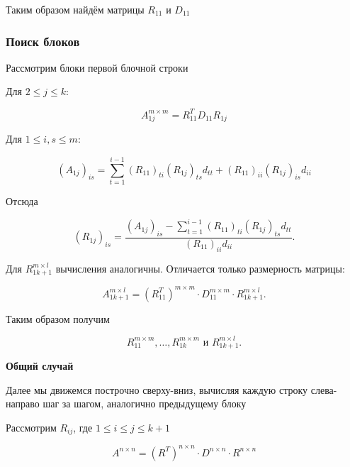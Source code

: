 \documentclass[a4paper,12pt]{article}
\begin{document}
Таким образом найдём матрицы $R_{11}$ и $D_{11}$


\subsubsection{Поиск блоков}

Рассмотрим блоки первой блочной строки

Для $2 \leq j \leq k$:

$$
A_{1j}^{m \times m} = R_{11}^T D_{11} R_{1j}
$$

Для $1 \leq i, s \leq m$:

$$
(A_{1j})_{is}
=
\sum_{t=1}^{i-1}
(R_{11})_{ti} (R_{1j})_{ts} d_{tt}
+
(R_{11})_{ii} (R_{1j})_{is} d_{ii}
$$

Отсюда

$$
(R_{1j})_{is}
=
\frac{
  (A_{1j})_{is}
  -
  \sum_{t=1}^{i-1}
  (R_{11})_{ti} (R_{1j})_{ts} d_{tt}
}{
  (R_{11})_{ii} d_{ii}
}.
$$

Для $R_{1k+1}^{m \times l}$ вычисления аналогичны. Отличается только
размерность матрицы:

$$
A_{1k+1}^{m \times l}
=
(R_{11}^T)^{m \times m}
\cdot
D_{11}^{m \times m}
\cdot
R_{1k+1}^{m \times l}.
$$

Таким образом получим

$$
R_{11}^{m \times m},
\ldots,
R_{1k}^{m \times m}
\text{ и }
R_{1k+1}^{m \times l}.
$$


\medskip

\textbf{Общий случай}

Далее мы движемся построчно сверху-вниз, вычисляя каждую строку слева-направо шаг за шагом, аналогично предыдущему блоку

Рассмотрим $R_{ij}$, где $1 \leq i \leq j \leq k+1$

$$
A^{n \times n}
=
(R^T)^{n \times n}
\cdot
D^{n \times n}
\cdot
R^{n \times n}
$$
\end{document}
